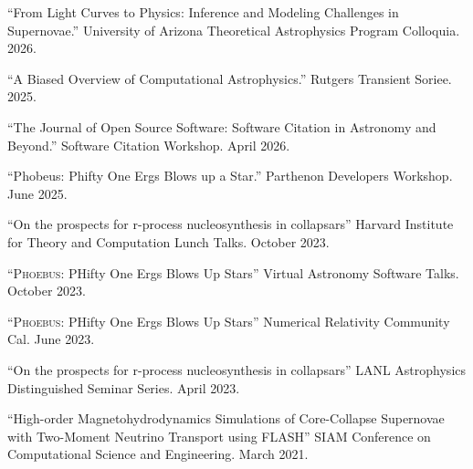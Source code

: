 \documentclass[11pt]{vitae}
\begin{document}

\begin{publist}

\item ``From Light Curves to Physics: Inference and Modeling Challenges in Supernovae.'' University of Arizona Theoretical Astrophysics Program Colloquia. 2026.
\item ``A Biased Overview of Computational Astrophysics.'' Rutgers Transient Soriee. 2025.

\end{publist}

\begin{publist}

\item ``The Journal of Open Source Software: Software Citation in Astronomy and Beyond.'' Software Citation Workshop. April 2026.

\item ``Phobeus: Phifty One Ergs Blows up a Star.'' Parthenon Developers Workshop. June 2025.

\item ``On the prospects for r-process nucleosynthesis in collapsars'' Harvard Institute for Theory and Computation Lunch Talks. October 2023.

\item ``\textsc{Phoebus}: PHifty One Ergs Blows Up Stars'' Virtual Astronomy Software Talks. October 2023.

\item ``\textsc{Phoebus}: PHifty One Ergs Blows Up Stars'' Numerical Relativity Community Cal. June 2023.

\item ``On the prospects for r-process nucleosynthesis in collapsars'' LANL Astrophysics Distinguished Seminar Series. April 2023.

\item ``High-order Magnetohydrodynamics Simulations of Core-Collapse Supernovae with Two-Moment Neutrino Transport using FLASH'' SIAM Conference on Computational Science and Engineering. March 2021.

\end{publist}
\end{document}
